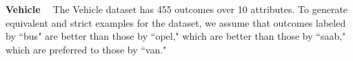 %
%
%
%
%
%
%

\smallskip \noindent \textbf{Vehicle \ }
The Vehicle dataset has 455 outcomes over 10 attributes.
To generate equivalent and strict examples for the dataset,
we assume that outcomes labeled by ``bus" are better than
those by ``opel," which are better than those
by ``saab," which are preferred to those by ``van."

